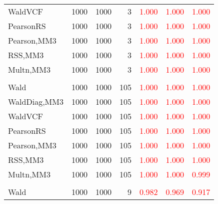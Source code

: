 \documentclass[
]{article}
\begin{document}
\begin{table}[H]
{\begin{tabular}[t]{lrrrrrr}
\hspace{1em}WaldVCF & 1000 & 1000 & 3 & \textcolor{red}{1.000} & \textcolor{red}{1.000} & \textcolor{red}{1.000}\\
\hspace{1em}PearsonRS & 1000 & 1000 & 3 & \textcolor{red}{1.000} & \textcolor{red}{1.000} & \textcolor{red}{1.000}\\
\hspace{1em}Pearson,MM3 & 1000 & 1000 & 3 & \textcolor{red}{1.000} & \textcolor{red}{1.000} & \textcolor{red}{1.000}\\
\hspace{1em}RSS,MM3 & 1000 & 1000 & 3 & \textcolor{red}{1.000} & \textcolor{red}{1.000} & \textcolor{red}{1.000}\\
\hspace{1em}Multn,MM3 & 1000 & 1000 & 3 & \textcolor{red}{1.000} & \textcolor{red}{1.000} & \textcolor{red}{1.000}\\
\addlinespace[0.3em]
\multicolumn{7}{l}{\textbf{1F 15V}}\\
\hspace{1em}Wald & 1000 & 1000 & 105 & \textcolor{red}{1.000} & \textcolor{red}{1.000} & \textcolor{red}{1.000}\\
\hspace{1em}WaldDiag,MM3 & 1000 & 1000 & 105 & \textcolor{red}{1.000} & \textcolor{red}{1.000} & \textcolor{red}{1.000}\\
\hspace{1em}WaldVCF & 1000 & 1000 & 105 & \textcolor{red}{1.000} & \textcolor{red}{1.000} & \textcolor{red}{1.000}\\
\hspace{1em}PearsonRS & 1000 & 1000 & 105 & \textcolor{red}{1.000} & \textcolor{red}{1.000} & \textcolor{red}{1.000}\\
\hspace{1em}Pearson,MM3 & 1000 & 1000 & 105 & \textcolor{red}{1.000} & \textcolor{red}{1.000} & \textcolor{red}{1.000}\\
\hspace{1em}RSS,MM3 & 1000 & 1000 & 105 & \textcolor{red}{1.000} & \textcolor{red}{1.000} & \textcolor{red}{1.000}\\
\hspace{1em}Multn,MM3 & 1000 & 1000 & 105 & \textcolor{red}{1.000} & \textcolor{red}{1.000} & \textcolor{red}{0.999}\\
\addlinespace[0.3em]
\multicolumn{7}{l}{\textbf{2F 10V}}\\
\hspace{1em}Wald & 1000 & 1000 & 9 & \textcolor{red}{0.982} & \textcolor{red}{0.969} & \textcolor{red}{0.917}\\

\end{tabular}}
\end{table}
\end{document}
